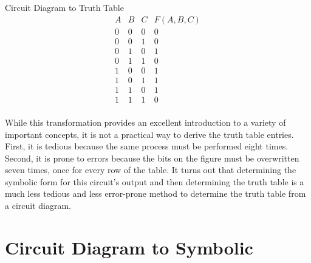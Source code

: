 \begin{process}{Circuit Diagram to Truth Table}
$$
\begin{array}{c|c|c||c}
A & B & C & F(A,B,C) \\ \hline \hline
0 & 0 & 0 & 0  \\ \hline
0 & 0 & 1 & 0  \\ \hline
0 & 1 & 0 & 1  \\ \hline
0 & 1 & 1 & 0  \\ \hline
1 & 0 & 0 & 1  \\ \hline
1 & 0 & 1 & 1  \\ \hline
1 & 1 & 0 & 1  \\ \hline
1 & 1 & 1 & 0  \\
\end{array}$$
\end{process}

While this transformation provides an excellent introduction to a variety
of important concepts, it is not a practical way to derive the truth table
entries.  First, it is tedious because the same process must be performed
eight times.  Second, it is prone to errors because the bits on the figure
must be overwritten seven times, once for every row of the table.
It turns out that determining the symbolic
form for this circuit's output and then determining the truth table is a
much less tedious and less error-prone method to determine the truth table
from a circuit diagram.

\section{Circuit Diagram to Symbolic}

